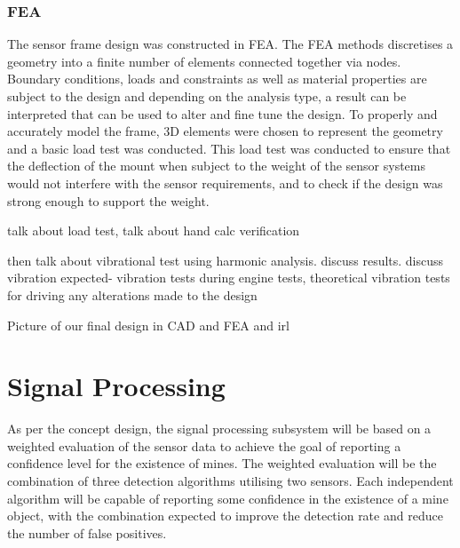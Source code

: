 \documentclass[main.tex]{subfiles}
\begin{document}
\subsubsection{FEA}
The sensor frame design was constructed in FEA. The FEA methods discretises a geometry into a finite number of elements connected together via nodes. Boundary conditions, loads and constraints as well as material properties are subject to the design and depending on the analysis type, a result can be interpreted that can be used to alter and fine tune the design.  To properly and accurately model the frame, 3D elements were chosen to represent the geometry and a basic load test was conducted. This load test was conducted to ensure that the deflection of the mount when subject to the weight of the sensor systems would not interfere with the sensor requirements, and to check if the design was strong enough to support the weight. 

talk about load test, talk about hand calc verification

then talk about vibrational test using harmonic analysis. discuss results. discuss vibration expected- vibration tests during engine tests, theoretical vibration tests for driving
any alterations made to the design

Picture of our final design in CAD and FEA and irl



    

\section{Signal Processing}


As per the concept design, the signal processing subsystem will be based on a weighted evaluation of the sensor data to achieve the goal of reporting a confidence level for the existence of mines.
The weighted evaluation will be the combination of three detection algorithms utilising two sensors. Each independent algorithm will be capable of reporting some confidence in the existence of a mine object, with the combination expected to improve the detection rate and reduce the number of false positives.
\end{document}
